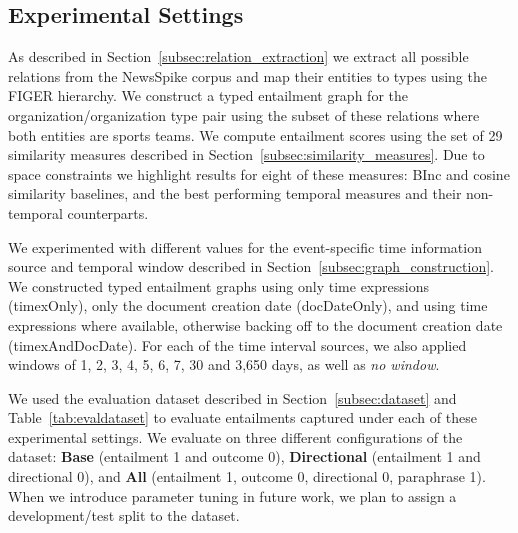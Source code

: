 \documentclass[11pt]{article}
\begin{document}
\subsection{Experimental Settings}
\label{sec:experiments}
As described in Section~\ref{subsec:relation_extraction} we extract all possible relations from the NewsSpike corpus and map their entities to types using the FIGER hierarchy. We construct a typed entailment graph for the organization/organization type pair using the subset of these relations where both entities are sports teams. We compute entailment scores using the set of 29 similarity measures described in Section~\ref{subsec:similarity_measures}. Due to space constraints we highlight results for eight of these measures: BInc and cosine similarity baselines, and the best performing temporal measures and their non-temporal counterparts. 

We experimented with different values for the event-specific time information source and temporal window described in Section~\ref{subsec:graph_construction}. We constructed typed entailment graphs using only time expressions (timexOnly), only the document creation date (docDateOnly), and using time expressions where available, otherwise backing off to the document creation date (timexAndDocDate). For each of the time interval sources, we also applied windows of 1, 2, 3, 4, 5, 6, 7, 30 and 3,650 days, as well as \textit{no window}.

We used the evaluation dataset described in Section~\ref{subsec:dataset} and Table~\ref{tab:evaldataset} to evaluate entailments captured under each of these experimental settings. We evaluate on three different configurations of the dataset: \textbf{Base} (entailment 1 and outcome 0), \textbf{Directional} (entailment 1 and directional 0), and \textbf{All} (entailment 1, outcome 0, directional 0, paraphrase 1). When we introduce parameter tuning in future work, we plan to assign a development/test split to the dataset.
\end{document}
